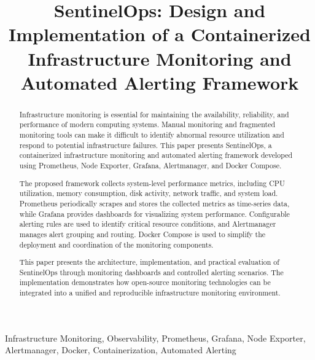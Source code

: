 \documentclass[conference]{IEEEtran}
\begin{document}
\title{SentinelOps: Design and Implementation of a
Containerized Infrastructure Monitoring and
Automated Alerting Framework}

\author{
}

\maketitle

\begin{abstract}
Infrastructure monitoring is essential for maintaining the
availability, reliability, and performance of modern computing
systems. Manual monitoring and fragmented monitoring tools can
make it difficult to identify abnormal resource utilization and
respond to potential infrastructure failures. This paper presents
SentinelOps, a containerized infrastructure monitoring and
automated alerting framework developed using Prometheus,
Node Exporter, Grafana, Alertmanager, and Docker Compose.

The proposed framework collects system-level performance
metrics, including CPU utilization, memory consumption, disk
activity, network traffic, and system load. Prometheus periodically
scrapes and stores the collected metrics as time-series data,
while Grafana provides dashboards for visualizing system
performance. Configurable alerting rules are used to identify
critical resource conditions, and Alertmanager manages alert
grouping and routing. Docker Compose is used to simplify the
deployment and coordination of the monitoring components.

This paper presents the architecture, implementation, and
practical evaluation of SentinelOps through monitoring dashboards
and controlled alerting scenarios. The implementation demonstrates
how open-source monitoring technologies can be integrated into
a unified and reproducible infrastructure monitoring environment.
\end{abstract}

\begin{IEEEkeywords}
Infrastructure Monitoring, Observability, Prometheus,
Grafana, Node Exporter, Alertmanager, Docker,
Containerization, Automated Alerting
\end{IEEEkeywords}
\end{document}
